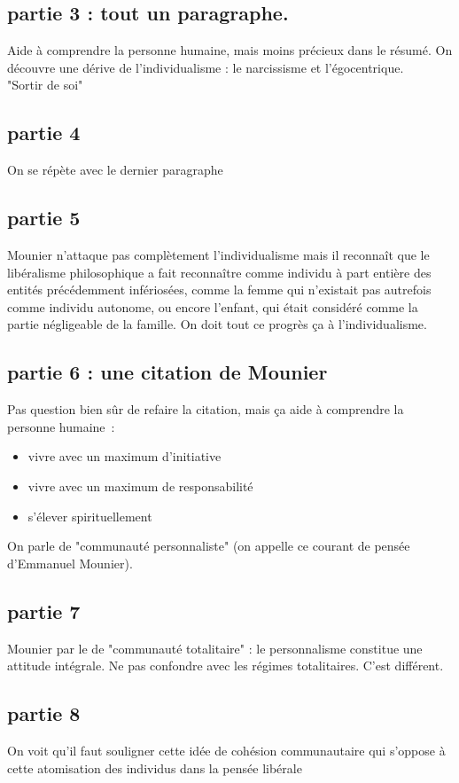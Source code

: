 \subsection{partie 3 : tout un paragraphe.}
Aide à comprendre la personne humaine, mais moins précieux dans le résumé. On découvre une dérive de l'individualisme : le narcissisme et l'égocentrique.\\
"Sortir de soi"

\subsection{partie 4}
On se répète avec le dernier paragraphe

\subsection{partie 5}

Mounier n'attaque pas complètement l'individualisme mais il reconnaît que le libéralisme philosophique a fait reconnaître comme individu à part entière des entités précédemment infériosées, comme la femme qui n'existait pas autrefois comme individu autonome, ou encore l'enfant, qui était considéré comme la partie négligeable de la famille. On doit tout ce progrès ça à l'individualisme.

\subsection{partie 6 : une citation de Mounier}
Pas question bien sûr de refaire la citation, mais ça aide à comprendre la personne humaine~:
\begin{itemize}
    \item vivre avec un maximum d'initiative
    \item vivre avec un maximum de responsabilité
    \item s'élever spirituellement
\end{itemize}
On parle de "communauté personnaliste" (on appelle ce courant de pensée d'Emmanuel Mounier).

\subsection{partie 7}
Mounier par le de "communauté totalitaire" : le personnalisme constitue une attitude intégrale. Ne pas confondre avec les régimes totalitaires. C'est différent.

\subsection{partie 8}
On voit qu'il faut souligner cette idée de cohésion communautaire qui s'oppose à cette atomisation des individus dans la pensée libérale

